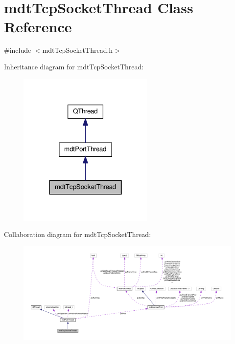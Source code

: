 \hypertarget{classmdt_tcp_socket_thread}{\section{mdt\-Tcp\-Socket\-Thread Class Reference}
\label{classmdt_tcp_socket_thread}
}


{\ttfamily \#include $<$mdt\-Tcp\-Socket\-Thread.\-h$>$}



Inheritance diagram for mdt\-Tcp\-Socket\-Thread\-:\nopagebreak
\begin{figure}[H]
\begin{center}
\leavevmode
\includegraphics[width=190pt]{classmdt_tcp_socket_thread__inherit__graph}
\end{center}
\end{figure}


Collaboration diagram for mdt\-Tcp\-Socket\-Thread\-:\nopagebreak
\begin{figure}[H]
\begin{center}
\leavevmode
\includegraphics[width=350pt]{classmdt_tcp_socket_thread__coll__graph}
\end{center}
\end{figure}
